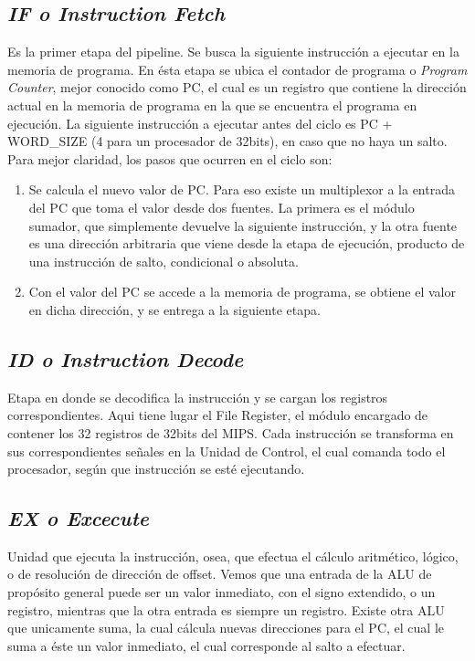 \documentclass[12pt]{article}
\begin{document}
\subsection{\textit{IF o Instruction Fetch}}
Es la primer etapa del pipeline. Se busca la siguiente instrucción a ejecutar en la memoria de programa. En ésta etapa se ubica el contador de programa o \textit{Program Counter}, mejor conocido como PC, el cual es un registro que contiene la dirección actual en la memoria de programa en la que se encuentra el programa en ejecución. La siguiente instrucción a ejecutar antes del ciclo es PC + WORD\_SIZE (4 para un procesador de 32bits), en caso que no haya un salto. Para mejor claridad, los pasos que ocurren en el ciclo son:

\begin{enumerate}
    \item Se calcula el nuevo valor de PC. Para eso existe un multiplexor a la entrada del PC que toma el valor desde dos fuentes. La primera es el módulo sumador, que simplemente devuelve la siguiente instrucción, y la otra fuente es una dirección arbitraria que viene desde la etapa de ejecución, producto de una instrucción de salto, condicional o absoluta.
    \item Con el valor del PC se accede a la memoria de programa, se obtiene el valor en dicha dirección, y se entrega a la siguiente etapa.
\end{enumerate}

\subsection{\textit{ID o Instruction Decode}}
Etapa en donde se decodifica la instrucción y se cargan los registros correspondientes. Aqui tiene lugar el File Register, el módulo encargado de contener los 32 registros de 32bits del MIPS. Cada instrucción se transforma en sus correspondientes señales en la Unidad de Control, el cual comanda todo el procesador, según que instrucción se esté ejecutando.

\subsection{\textit{EX o Excecute}}
Unidad que ejecuta la instrucción, osea, que efectua el cálculo aritmético, lógico, o de resolución de dirección de offset. Vemos que una entrada de la ALU de propósito general puede ser un valor inmediato, con el signo extendido, o un registro, mientras que la otra entrada es siempre un registro. Existe otra ALU que unicamente suma, la cual cálcula nuevas direcciones para el PC, el cual le suma a éste un valor inmediato, el cual corresponde al salto a efectuar.
\end{document}
